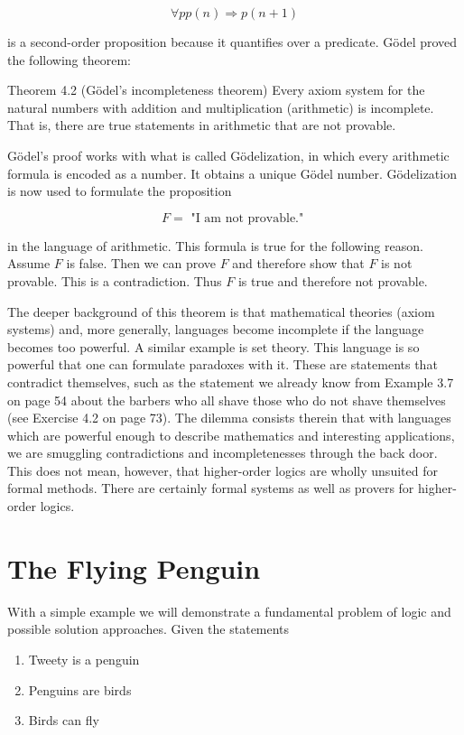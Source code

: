 \documentclass[10pt]{book}
\begin{document}
$$
\forall p p(n) \Rightarrow p(n+1)
$$

is a second-order proposition because it quantifies over a predicate. Gödel proved the following theorem:

Theorem 4.2 (Gödel's incompleteness theorem) Every axiom system for the natural numbers with addition and multiplication (arithmetic) is incomplete. That is, there are true statements in arithmetic that are not provable.

Gödel's proof works with what is called Gödelization, in which every arithmetic formula is encoded as a number. It obtains a unique Gödel number. Gödelization is now used to formulate the proposition

$$
F=\text { "I am not provable." }
$$

in the language of arithmetic. This formula is true for the following reason. Assume $F$ is false. Then we can prove $F$ and therefore show that $F$ is not provable. This is a contradiction. Thus $F$ is true and therefore not provable.

The deeper background of this theorem is that mathematical theories (axiom systems) and, more generally, languages become incomplete if the language becomes too powerful. A similar example is set theory. This language is so powerful that one can formulate paradoxes with it. These are statements that contradict themselves, such as the statement we already know from Example 3.7 on page 54 about the barbers who all shave those who do not shave themselves (see Exercise 4.2 on page 73). The dilemma consists therein that with languages which are powerful enough to describe mathematics and interesting applications, we are smuggling contradictions and incompletenesses through the back door. This does not mean, however, that higher-order logics are wholly unsuited for formal methods. There are certainly formal systems as well as provers for higher-order logics.

\section{The Flying Penguin}
With a simple example we will demonstrate a fundamental problem of logic and possible solution approaches. Given the statements


\begin{enumerate}
  \item Tweety is a penguin
  \item Penguins are birds
  \item Birds can fly
\end{enumerate}
\end{document}
